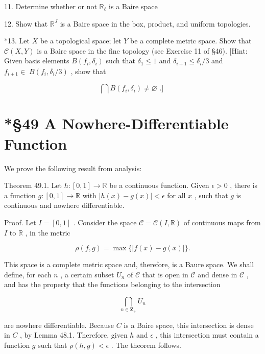 \documentclass[10pt]{article}
\begin{document}
11. Determine whether or not \({\mathbb{R}}_{\ell }\) is a Baire space

12. Show that \({\mathbb{R}}^{J}\) is a Baire space in the box, product, and uniform topologies.

*13. Let \(X\) be a topological space; let \(Y\) be a complete metric space. Show that \(\mathcal{C}\left( {X,Y}\right)\) is a Baire space in the fine topology (see Exercise 11 of §46). [Hint: Given basis elements \(B\left( {{f}_{i},{\delta }_{i}}\right)\) such that \({\delta }_{1} \leq  1\) and \({\delta }_{i + 1} \leq  {\delta }_{i}/3\) and \({f}_{i + 1} \in \; B\left( {{f}_{i},{\delta }_{i}/3}\right)\) , show that

\[
\bigcap B\left( {{f}_{i},{\delta }_{i}}\right)  \neq  \varnothing \text{ .] }
\]

\section*{*§49 A Nowhere-Differentiable Function}

We prove the following result from analysis:

Theorem 49.1. Let \(h : \left\lbrack  {0,1}\right\rbrack   \rightarrow  \mathbb{R}\) be a continuous function. Given \(\epsilon  > 0\) , there is a function \(g : \left\lbrack  {0,1}\right\rbrack   \rightarrow  \mathbb{R}\) with \(\left| {h\left( x\right)  - g\left( x\right) }\right|  < \epsilon\) for all \(x\) , such that \(g\) is continuous and nowhere differentiable.

Proof. Let \(I = \left\lbrack  {0,1}\right\rbrack\) . Consider the space \(\mathcal{C} = \mathcal{C}\left( {I,\mathbb{R}}\right)\) of continuous maps from \(I\) to \(\mathbb{R}\) , in the metric

\[
\rho \left( {f,g}\right)  = \max \{ \left| {f\left( x\right)  - g\left( x\right) }\right| \} .
\]

This space is a complete metric space and, therefore, is a Baure space. We shall define, for each \(n\) , a certain subset \({U}_{n}\) of \(\mathcal{C}\) that is open in \(\mathcal{C}\) and dense in \(\mathcal{C}\) , and has the property that the functions belonging to the intersection

\[
\mathop{\bigcap }\limits_{{n \in  {\mathbf{Z}}_{ + }}}{U}_{n}
\]

are nowhere differentiable. Because \(C\) is a Baire space, this intersection is dense in \(C\) , by Lemma 48.1. Therefore, given \(h\) and \(\epsilon\) , this intersection must contain a function \(g\) such that \(\rho \left( {h,g}\right)  < \epsilon\) . The theorem follows.
\end{document}
